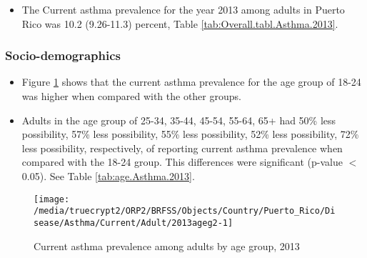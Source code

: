 \begin{itemize}


\item The Current asthma prevalence for the year 2013 among adults in Puerto Rico was 10.2 (9.26-11.3) percent, 
Table \ref{tab:Overall.tabl.Asthma.2013}.

\end{itemize}



\newpage
\subsubsection{Socio-demographics}

\begin{itemize}

\item Figure \ref{fig:age.Asthma.2013} shows that the current asthma prevalence for the age group of
18-24
was higher when compared with the other groups.

\item Adults in the age group of 25-34, 35-44, 45-54, 55-64, 65+ had 50\% less possibility, 57\% less possibility, 55\% less possibility, 52\% less possibility, 72\% less possibility, respectively, of reporting current asthma prevalence when compared with the 18-24 group. This differences were significant (p-value $<$ 0.05). See Table \ref{tab:age.Asthma.2013}.


\end{itemize}


\begin{figure}[H]
\caption{Current asthma prevalence among adults by age group, 
2013}
\begin{knitrout}
\color{fgcolor}

{\centering \texttt{[image: /media/truecrypt2/ORP2/BRFSS/Objects/Country/Puerto\_Rico/Disease/Asthma/Current/Adult/2013ageg2-1]} 

}



\end{knitrout}
\label{fig:age.Asthma.2013}
\end{figure}

